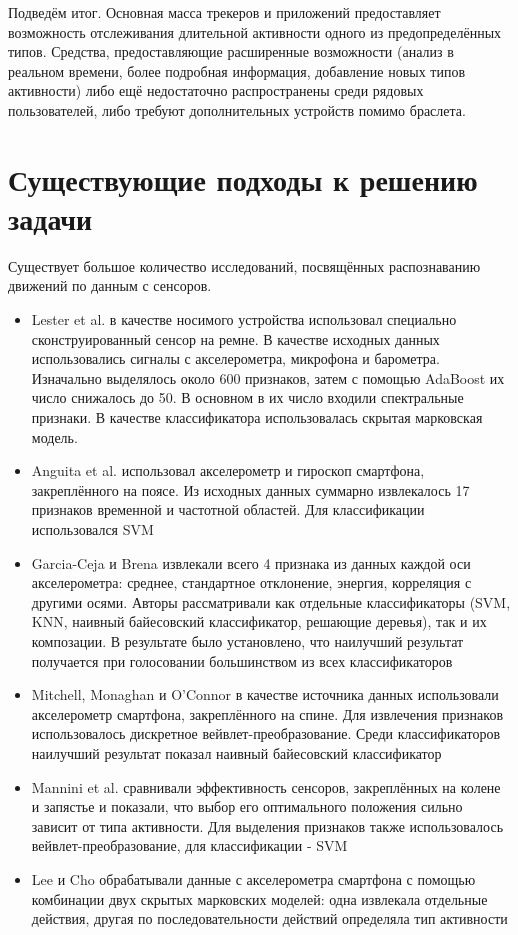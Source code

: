 Подведём итог. Основная масса трекеров и приложений предоставляет возможность отслеживания длительной активности одного из предопределённых типов. Средства, предоставляющие расширенные возможности (анализ в реальном времени, более подробная информация, добавление новых типов активности) либо ещё недостаточно распространены среди рядовых пользователей, либо требуют дополнительных устройств помимо браслета. 

\section{Существующие подходы к решению задачи}

Существует большое количество исследований, посвящённых распознаванию движений по данным с сенсоров. 
\begin{itemize}
\item Lester et al.\cite{review_lester} в качестве носимого устройства использовал специально сконструированный сенсор на ремне. В качестве исходных данных использовались сигналы с акселерометра, микрофона и барометра. Изначально выделялось около 600 признаков, затем с помощью AdaBoost их число снижалось до 50. В основном в их число входили спектральные признаки. В качестве классификатора использовалась скрытая марковская модель.
\item Anguita et al.\cite{review_anguita} использовал акселерометр и гироскоп смартфона, закреплённого на поясе. Из исходных данных суммарно извлекалось 17 признаков временной и частотной областей. Для классификации использовался SVM
\item Garcia-Ceja и Brena\cite{review_garcia} извлекали всего 4 признака из данных каждой оси акселерометра: среднее, стандартное отклонение, энергия, корреляция с другими осями. Авторы рассматривали как отдельные классификаторы (SVM, KNN, наивный байесовский классификатор, решающие деревья), так и их композации. В результате было установлено, что наилучший результат получается при голосовании большинством из всех классификаторов
\item Mitchell, Monaghan и O'Connor\cite{review_mitchell} в качестве источника данных использовали акселерометр смартфона, закреплённого на спине. Для извлечения признаков использовалось дискретное вейвлет-преобразование. Среди классификаторов наилучший результат показал наивный байесовский классификатор
\item Mannini et al.\cite{review_mannini} сравнивали эффективность сенсоров, закреплённых на колене и запястье и показали, что выбор его оптимального положения сильно зависит от типа активности. Для выделения признаков также использовалось вейвлет-преобразование, для классификации - SVM
\item Lee и Cho\cite{review_lee} обрабатывали данные с акселерометра смартфона с помощью комбинации двух скрытых марковских моделей: одна извлекала отдельные действия, другая по последовательности действий определяла тип активности
\end{itemize}


